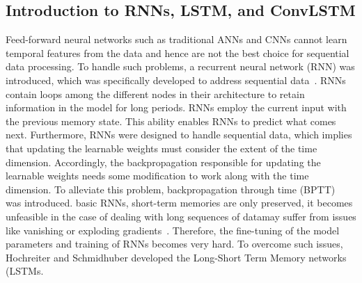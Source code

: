 \subsection{Introduction to RNNs, LSTM, and ConvLSTM}
Feed-forward neural networks such as traditional ANNs and CNNs cannot learn temporal features from the data and hence are not the best choice for sequential data processing.
To handle such problems, a recurrent neural network (RNN) was introduced, which was specifically developed to address sequential data~\cite{aggarwal2018neural, Lecun2015, goodfellow2016deep}. 
RNNs contain loops among the different nodes in their architecture to retain information in the model for long periods.
RNNs employ the current input with the previous memory state.
This ability \DIFdelbegin {}\DIFdelend \DIFaddbegin {}\DIFaddend enables RNNs to predict what comes next. 
Furthermore, RNNs were designed to handle sequential data, which implies that updating the learnable weights must consider the extent of the time dimension. 
Accordingly, the backpropagation \DIFdelbegin {}\DIFdelend \DIFaddbegin {}\DIFaddend responsible for updating the learnable weights needs some modification to work along with the time dimension.
To alleviate this problem, backpropagation through time (BPTT)~\cite{aggarwal2018neural, goodfellow2016deep} was introduced. 
\DIFdelbegin {}\DIFdelend \DIFaddbegin {}\DIFaddend basic RNNs, short-term memories are only preserved, \DIFdelbegin {}\DIFdelend \DIFaddbegin {}\DIFaddend it becomes unfeasible in the case of dealing with long sequences of data\DIFdelbegin {}\DIFdelend \DIFaddbegin {}\DIFaddend may suffer from issues like vanishing or exploding gradients~\cite{bengio1994learning}.
Therefore, the fine-tuning of the model parameters and training of RNNs becomes very hard.
To overcome such issues, Hochreiter and Schmidhuber developed the Long-Short Term Memory networks (LSTMs\DIFdelbegin {}\DIFdelend \DIFaddbegin {}\DIFaddend .
